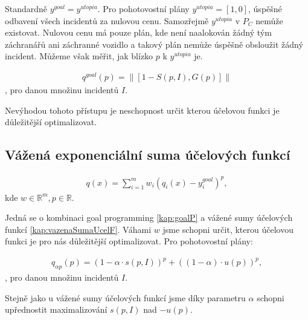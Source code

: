 Standardně $y^{goal} = y^{utopia}$.
Pro pohotovostní plány $y^{utopia} = [1, 0]$, úspěšné odbavení všech incidentů za nulovou cenu.
Samozřejmě $y^{utopia}$ v $P_C$ nemůže existovat.
Nulovou cenu má pouze plán, kde není naalokován žádný tým záchranářů ani záchranné vozidlo a takový plán nemůže úspěšně obsloužit žádný incident. 
Můžeme však měřit, jak blízko $p$ k $y^{utopia}$ je.

\begin{definice}
  \begin{align*}
    q^{goal}(p) = \| [1 - S(p, I), G(p)] \|
  \end{align*}
  , pro danou množinu incidentů $I$.
  \\
\end{definice}

Nevýhodou tohoto přístupu je neschopnost určit kterou účelovou funkci je důležitější optimalizovat.

\subsection{Vážená exponenciální suma účelových funkcí}\label{kap:vazenaSumUcF}

\begin{definice}
  \begin{align*}
    q(x) = \sum_{i=1}^{m} w_i (q_i(x) - y_i^{goal})^p,
  \end{align*}
  kde $w \in \mathbb{R}^m, p \in \mathbb{R}$.
  \\
\end{definice}

Jedná se o kombinaci goal programming \ref{kap:goalP} a vážené sumy účelových funkcí \ref{kap:vazenaSumaUcelF}.
Váhami $w$ jsme schopni určit, kterou účelovou funkci je pro nás důležitější optimalizovat. Pro pohotovostní plány:

\begin{definice}
  \begin{align*}
    q_{\alpha p}(p) = (1 - \alpha \cdot s(p, I))^p + ((1 - \alpha) \cdot u(p))^p,
  \end{align*}
  , pro danou množinu incidentů $I$.
  \\ 
\end{definice}

Stejně jako u vážené sumy účelových funkcí jsme díky parametru $\alpha$ schopni upřednostit maximalizování $s(p, I)$ nad $-u(p)$.

